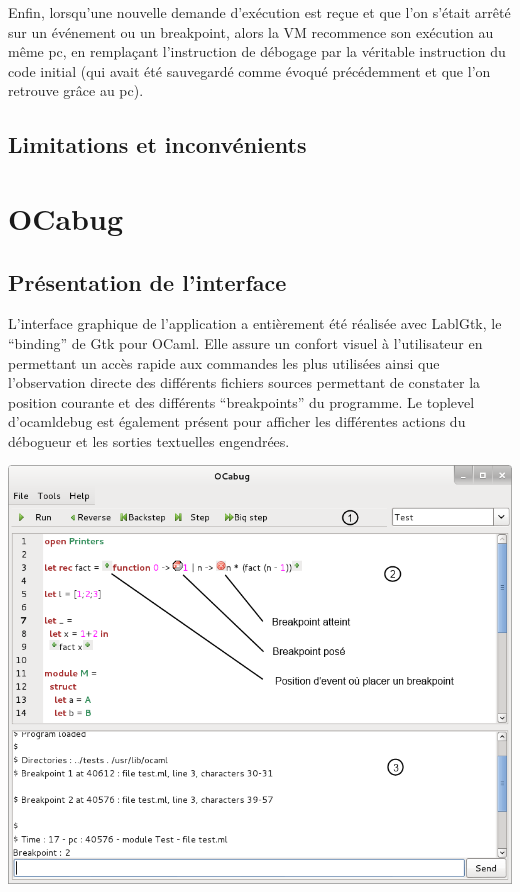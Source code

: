 \documentclass[11pt,a4paper]{report}
\begin{document}
\smallskip

Enfin, lorsqu'une nouvelle demande d'exécution est reçue et que l'on s'était arrêté sur un événement ou un breakpoint, alors la VM recommence son exécution au même pc, en remplaçant l'instruction de débogage par la véritable instruction du code initial (qui avait été sauvegardé comme évoqué précédemment et que l'on retrouve grâce au pc).


\section{Limitations et inconvénients} %


\chapter{OCabug}



\section{Présentation de l'interface}

L'interface graphique de l'application a entièrement été réalisée avec LablGtk, le ``binding'' de Gtk pour OCaml.
Elle assure un confort visuel à l'utilisateur en permettant un accès rapide aux commandes les plus utilisées ainsi
que l'observation directe des différents fichiers sources permettant de constater la position courante 
et des différents ``breakpoints'' du programme. Le toplevel d'ocamldebug est également présent pour afficher
les différentes actions du débogueur et les sorties textuelles engendrées.

\includegraphics{screen_exec}
\end{document}
